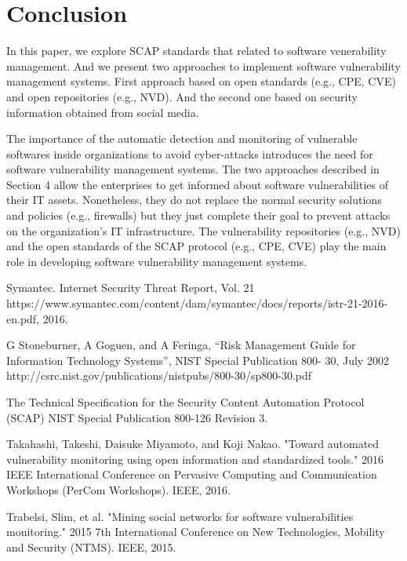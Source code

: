 \documentclass{llncs}
\begin{document}
\section{Conclusion}
In this paper, we explore SCAP standards that related to software venerability management. And we present two approaches to implement software vulnerability management systems. First approach based on open standards (e.g., CPE, CVE) and open repositories (e.g., NVD). And the second one based on  security information obtained from social media.  
\par The importance of the automatic detection and monitoring of vulnerable softwares inside organizations to avoid cyber-attacks introduces the need for software vulnerability management systems. The two approaches described in Section 4 allow the enterprises to get informed about software vulnerabilities of their IT assets. Nonetheless, they do not replace the normal security solutions and policies (e.g., firewalls) but they just complete their goal to prevent attacks on the organization's IT infrastructure. The vulnerability repositories (e.g., NVD) and the open standards of the SCAP protocol (e.g., CPE, CVE) play the main role in developing software vulnerability management systems.   



\begin{thebibliography}{[MT1]}

%


Symantec. Internet Security Threat Report, Vol. 21 https://www.symantec.com/content/dam/symantec/docs/reports/istr-21-2016-en.pdf, 2016.

G Stoneburner, A Goguen, and A Feringa, “Risk Management Guide
for Information Technology Systems”, NIST Special Publication 800-
30, July 2002
http://csrc.nist.gov/publications/nistpubs/800-30/sp800-30.pdf

The Technical Specification for the
Security Content Automation Protocol (SCAP)
NIST Special Publication 800-126
Revision 3.

Takahashi, Takeshi, Daisuke Miyamoto, and Koji Nakao. "Toward automated vulnerability monitoring using open information and standardized tools." 2016 IEEE International Conference on Pervasive Computing and Communication Workshops (PerCom Workshops). IEEE, 2016.

Trabelsi, Slim, et al. "Mining social networks for software vulnerabilities monitoring." 2015 7th International Conference on New Technologies, Mobility and Security (NTMS). IEEE, 2015.
%
\end{thebibliography}
\end{document}

